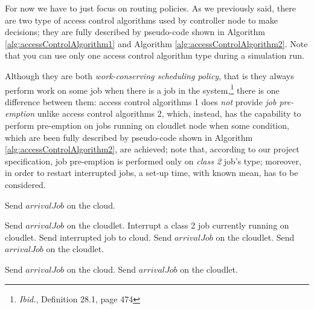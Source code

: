 \documentclass[10pt,a4paper]{article}
\begin{document}
For now we have to just focus on routing policies. As we previously said, there are two type of access control algorithms used by controller node to make decisions; they are fully described by pseudo-code shown in Algorithm \ref{alg:accessControlAlgorithm1} and Algorithm \ref{alg:accessControlAlgorithm2}. Note that you can use only one access control algorithm type during a simulation run.

Although they are both \textit{work-conserving scheduling policy}, that is they always perform work on some job when there is a job in the system,\footnote{\textit{Ibid.}, Definition 28.1, page 474} there is one difference between them: access control algorithms 1 does \textit{not} provide \textit{job pre-emption} unlike access control algorithms 2, which, instead, has the capability to perform pre-emption on jobs running on cloudlet node when some condition, which are been fully described by pseudo-code shown in Algorithm \ref{alg:accessControlAlgorithm2}, are achieved; note that, according to our project specification, job pre-emption is performed only on \textit{class 2} job's type; moreover, in order to restart interrupted jobs, a set-up time, with known mean, has to be considered.

\begin{algorithm}[h]
\caption{}\label{alg:accessControlAlgorithm2}
\begin{algorithmic}[h!]




	\State Send $\textit{arrivalJob}$ on the cloud.

	\State Send $\textit{arrivalJob}$ on the cloudlet.
	\State Interrupt a class 2 job currently running on cloudlet.
	\State Send interrupted job to cloud.
	\State Send $\textit{arrivalJob}$ on the cloudlet.
\Else 	
 	\State Send $\textit{arrivalJob}$ on the cloudlet.
\EndIf



\Else 

	\State Send $\textit{arrivalJob}$ on the cloud.
\Else 	
 	\State Send $\textit{arrivalJob}$ on the cloudlet.
\EndIf

\EndIf

\EndFunction

\end{algorithmic}
\end{algorithm}
\end{document}
